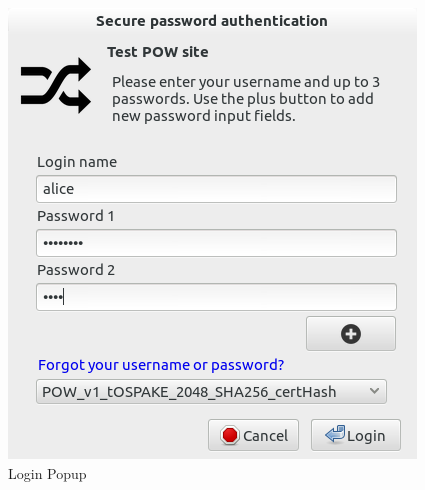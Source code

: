 \begin{figure}[htbp]
	\centering
	\includegraphics[width=.6\textwidth]{img/LoginPopup.png}
	\caption{Login Popup}\label{fig:loginpopup}
\end{figure}

